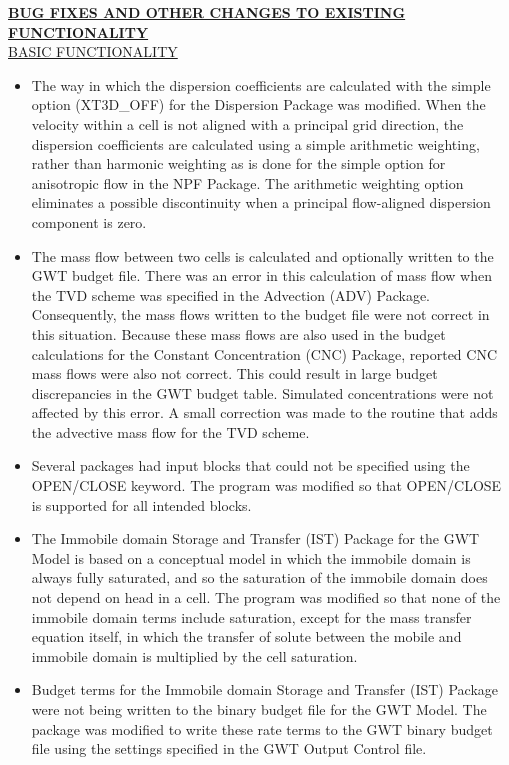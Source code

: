 	\textbf{\underline{BUG FIXES AND OTHER CHANGES TO EXISTING FUNCTIONALITY}} \\
	\underline{BASIC FUNCTIONALITY}
	\begin{itemize}
	        \item The way in which the dispersion coefficients are calculated with the simple option (XT3D\_OFF) for the Dispersion Package was modified.  When the velocity within a cell is not aligned with a principal grid direction, the  dispersion coefficients are calculated using a simple arithmetic weighting, rather than harmonic weighting as is done for the simple option for anisotropic flow in the NPF Package.  The arithmetic weighting option eliminates a possible discontinuity when a principal flow-aligned dispersion component is zero.
	        \item The mass flow between two cells is calculated and optionally written to the GWT budget file.  There was an error in this calculation of mass flow when the TVD scheme was specified in the Advection (ADV) Package.  Consequently, the mass flows written to the budget file were not correct in this situation.  Because these mass flows are also used in the budget calculations for the Constant Concentration (CNC) Package, reported CNC mass flows were also not correct.  This could result in large budget discrepancies in the GWT budget table.  Simulated concentrations were not affected by this error.  A small correction was made to the routine that adds the advective mass flow for the TVD scheme.
	        \item Several packages had input blocks that could not be specified using the OPEN/CLOSE keyword.  The program was modified so that OPEN/CLOSE is supported for all intended blocks.
	        \item The Immobile domain Storage and Transfer (IST) Package for the GWT Model is based on a conceptual model in which the immobile domain is always fully saturated, and so the saturation of the immobile domain does not depend on head in a cell.  The program was modified so that none of the immobile domain terms include saturation, except for the mass transfer equation itself, in which the transfer of solute between the mobile and immobile domain is multiplied by the cell saturation.
	        \item Budget terms for the Immobile domain Storage and Transfer (IST) Package were not being written to the binary budget file for the GWT Model.  The package was modified to write these rate terms to the GWT binary budget file using the settings specified in the GWT Output Control file.

\end{itemize}

